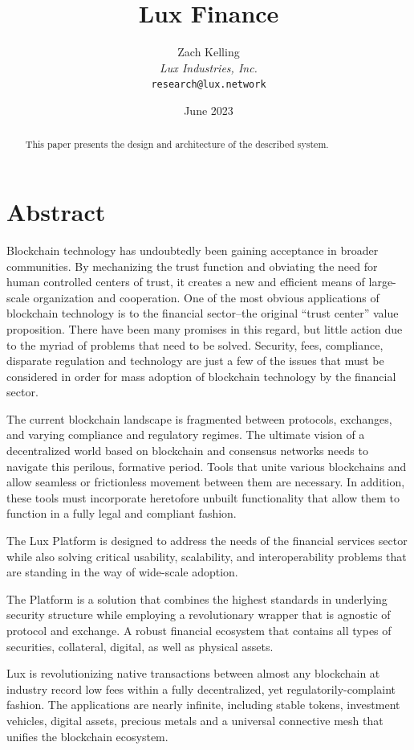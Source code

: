 \documentclass[11pt]{article}
\title{Lux Finance}
\author{Zach Kelling\\\textit{Lux Industries, Inc.}\\\texttt{research@lux.network}}
\date{June 2023}
\begin{document}
\luxcoverpage

\begin{abstract}
This paper presents the design and architecture of the described system.
\end{abstract}

\tableofcontents
\newpage


\section{Abstract}

Blockchain technology has undoubtedly been gaining acceptance in broader communities. By mechanizing the trust function and obviating the need for human controlled centers of trust, it creates a new and efficient means of large-scale organization and cooperation. One of the most obvious applications of blockchain technology is to the financial sector--the original ``trust center'' value proposition. There have been many promises in this regard, but little action due to the myriad of problems that need to be solved. Security, fees, compliance, disparate regulation and technology are just a few of the issues that must be considered in order for mass adoption of blockchain technology by the financial sector.


The current blockchain landscape is fragmented between protocols, exchanges, and varying compliance and regulatory regimes. The ultimate vision of a decentralized world based on blockchain and consensus networks needs to navigate this perilous, formative period. Tools that unite various blockchains and allow seamless or frictionless movement between them are necessary. In addition, these tools must incorporate heretofore unbuilt functionality that allow them to function in a fully legal and compliant fashion.


The Lux Platform is designed to address the needs of the financial services sector while also solving critical usability, scalability, and interoperability problems that are standing in the way of wide-scale adoption.


The Platform is a solution that combines the highest standards in underlying security structure while employing a revolutionary wrapper that is agnostic of protocol and exchange. A robust financial ecosystem that contains all types of securities, collateral, digital, as well as physical assets.


Lux is revolutionizing native transactions between almost any blockchain at industry record low fees within a fully decentralized, yet regulatorily-complaint fashion. The applications are nearly infinite, including stable tokens, investment vehicles, digital assets, precious metals and a universal connective mesh that unifies the blockchain ecosystem.
\end{document}
